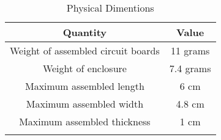 \begin{longtable}{ c | c }
\toprule
Quantity & Value \\
\midrule
Weight of assembled circuit boards & 11 grams \\
Weight of enclosure & 7.4 grams \\
Maximum assembled length & 6 cm \\
Maximum assembled width & 4.8 cm \\
Maximum assembled thickness & 1 cm \\
\bottomrule

\caption{Physical Dimentions}
\label{table:physical-dimentions}
\end{longtable}


